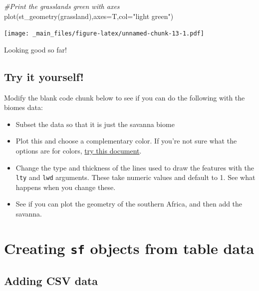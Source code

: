 \documentclass[
]{book}
\newenvironment{Shaded}{\begin{snugshade}}{\end{snugshade}}
\newcommand{\AttributeTok}[1]{\textcolor[rgb]{0.77,0.63,0.00}{#1}}
\newcommand{\CommentTok}[1]{\textcolor[rgb]{0.56,0.35,0.01}{\textit{#1}}}
\newcommand{\FunctionTok}[1]{\textcolor[rgb]{0.00,0.00,0.00}{#1}}
\newcommand{\NormalTok}[1]{#1}
\newcommand{\StringTok}[1]{\textcolor[rgb]{0.31,0.60,0.02}{#1}}
\providecommand{\tightlist}{%
  \setlength{\itemsep}{0pt}\setlength{\parskip}{0pt}}
\begin{document}
\begin{Shaded}
\begin{Highlighting}[]
\CommentTok{\#Print the grasslands green with axes}
\FunctionTok{plot}\NormalTok{(}\FunctionTok{st\_geometry}\NormalTok{(grassland),}\AttributeTok{axes=}\NormalTok{T,}\AttributeTok{col=}\StringTok{"light green"}\NormalTok{)}
\end{Highlighting}
\end{Shaded}

\texttt{[image: \_main\_files/figure-latex/unnamed-chunk-13-1.pdf]}

Looking good so far!

\hypertarget{try-it-yourself-1}{%
\section{Try it yourself!}\label{try-it-yourself-1}}

Modify the blank code chunk below to see if you can do the following with the biomes data:

\begin{itemize}
\tightlist
\item
  Subset the data so that it is just the savanna biome
\item
  Plot this and choose a complementary color. If you're not sure what the options are for colors, \href{http://www.stat.columbia.edu/~tzheng/files/Rcolor.pdf}{try this document}.
\item
  Change the type and thickness of the lines used to draw the features with the \texttt{lty} and \texttt{lwd} arguments. These take numeric values and default to 1. See what happens when you change these.
\item
  See if you can plot the geometry of the southern Africa, and then add the savanna.
\end{itemize}

\hypertarget{creating-sf-objects-from-table-data}{%
\chapter{\texorpdfstring{Creating \texttt{sf} objects from table data}{Creating sf objects from table data}}\label{creating-sf-objects-from-table-data}}

\hypertarget{adding-csv-data}{%
\section{Adding CSV data}\label{adding-csv-data}}
\end{document}
